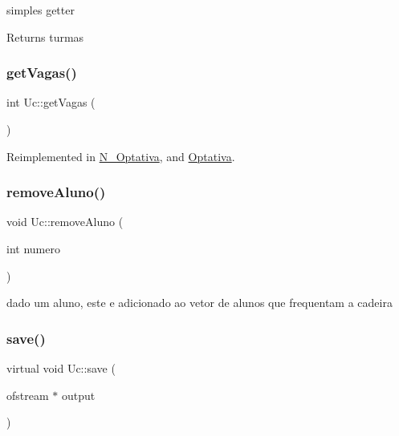 simples getter \begin{DoxyReturn}{Returns}
turmas 
\end{DoxyReturn}
\hypertarget{class_uc_aabb7272709731972c4bc574cfde28772}{}\label{class_uc_aabb7272709731972c4bc574cfde28772} 
\subsubsection{\texorpdfstring{get\+Vagas()}{getVagas()}}
{\footnotesize\ttfamily int Uc\+::get\+Vagas (\begin{DoxyParamCaption}{ }\end{DoxyParamCaption})\hspace{0.3cm}{\ttfamily [virtual]}}



Reimplemented in \hyperlink{class_n___optativa_a8eb826eecb5447077d8906eb5a687193}{N\+\_\+\+Optativa}, and \hyperlink{class_optativa_a675d4750bbe112a1b3d2c0b6bf64a94b}{Optativa}.

\hypertarget{class_uc_a528b6f919358f6ab1ffaf6f6542343b3}{}\label{class_uc_a528b6f919358f6ab1ffaf6f6542343b3} 
\subsubsection{\texorpdfstring{remove\+Aluno()}{removeAluno()}}
{\footnotesize\ttfamily void Uc\+::remove\+Aluno (\begin{DoxyParamCaption}\item[{int}]{numero }\end{DoxyParamCaption})}

dado um aluno, este e adicionado ao vetor de alunos que frequentam a cadeira \hypertarget{class_uc_a6d5fafb63b88b75408dab0911276ce3f}{}\label{class_uc_a6d5fafb63b88b75408dab0911276ce3f} 
\subsubsection{\texorpdfstring{save()}{save()}}
{\footnotesize\ttfamily virtual void Uc\+::save (\begin{DoxyParamCaption}\item[{ofstream $\ast$}]{output }\end{DoxyParamCaption})\hspace{0.3cm}{\ttfamily [pure virtual]}}



